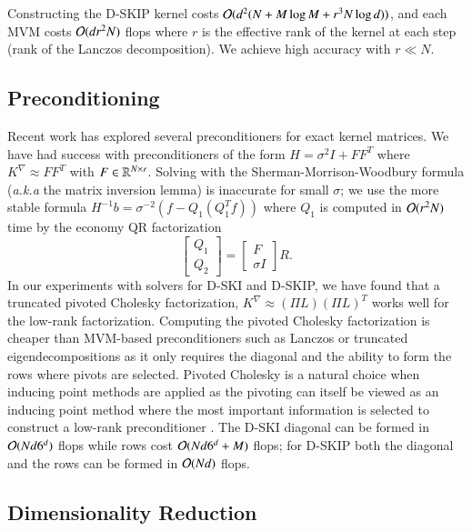 Constructing the D\hyp{}SKIP kernel costs $\mathcal{O}(d^2(N + M \log M+ r^3 N \log
d))$, and each MVM costs $\mathcal{O}(d r^2 N)$ flops where $r$ is the effective rank
of the kernel at each step (rank of the Lanczos decomposition). We achieve high
accuracy with $r \ll N$. 

\subsection{Preconditioning}

Recent work \citep{cutajar2016preconditioning} has explored several 
preconditioners for exact kernel matrices. We have had success with
preconditioners of the form $H = \sigma^2 I + FF^T$ where $K^\nabla \approx
FF^T$ with $F \in \mathbb{R}^{N \times r}$. Solving with the
Sherman\hyp{}Morrison\hyp{}Woodbury formula ({\em a.k.a} the matrix inversion
lemma) is inaccurate for small $\sigma$; we use the more stable formula $H^{-1}
b = \sigma^{-2} (f-Q_1 (Q_1^T f))$ where $Q_1$ is computed in $\mathcal{O}(r^2N)$ time
by the economy QR factorization
\begin{equation}\label{eqn:qrsmw}
  \begin{bmatrix} Q_1 \\ Q_2 \end{bmatrix} =
  \begin{bmatrix} F \\ \sigma I \end{bmatrix} R.
\end{equation}
In our experiments with solvers for D\hyp{}SKI and D\hyp{}SKIP, we have found
that a truncated pivoted Cholesky factorization, $K^{\nabla} \approx (\Pi L)(\Pi
L)^T$ works well for the low\hyp{}rank factorization. Computing the pivoted
Cholesky factorization is cheaper than MVM\hyp{}based preconditioners such as
Lanczos or truncated eigendecompositions as it only requires the diagonal and
the ability to form the rows where pivots are selected. Pivoted Cholesky is a
natural choice when inducing point methods are applied as the pivoting can
itself be viewed as an inducing point method where the most important
information is selected to construct a low\hyp{}rank preconditioner
\cite{harbrecht2012low}. The D\hyp{}SKI diagonal can be formed in $\mathcal{O}(Nd6^d)$
flops while rows cost $\mathcal{O}(Nd6^d + M)$ flops; for D\hyp{}SKIP both the
diagonal and the rows can be formed in $\mathcal{O}(Nd)$ flops.

\subsection{Dimensionality Reduction}

